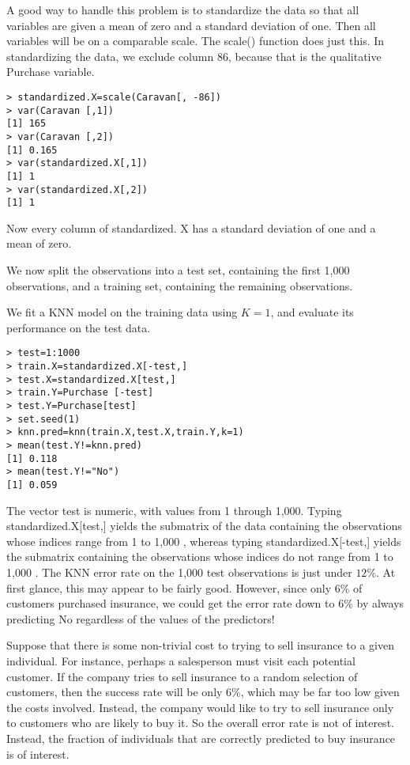 \documentclass[10pt]{article}
\begin{document}
A good way to handle this problem is to standardize the data so that all variables are given a mean of zero and a standard deviation of one. Then all variables will be on a comparable scale. The scale() function does just this. In standardizing the data, we exclude column 86, because that is the qualitative Purchase variable.

\begin{verbatim}
> standardized.X=scale(Caravan[, -86])
> var(Caravan [,1])
[1] 165
> var(Caravan [,2])
[1] 0.165
> var(standardized.X[,1])
[1] 1
> var(standardized.X[,2])
[1] 1
\end{verbatim}

Now every column of standardized. X has a standard deviation of one and a mean of zero.

We now split the observations into a test set, containing the first 1,000 observations, and a training set, containing the remaining observations.


We fit a KNN model on the training data using $K=1$, and evaluate its performance on the test data.

\begin{verbatim}
> test=1:1000
> train.X=standardized.X[-test,]
> test.X=standardized.X[test,]
> train.Y=Purchase [-test]
> test.Y=Purchase[test]
> set.seed(1)
> knn.pred=knn(train.X,test.X,train.Y,k=1)
> mean(test.Y!=knn.pred)
[1] 0.118
> mean(test.Y!="No")
[1] 0.059
\end{verbatim}

The vector test is numeric, with values from 1 through 1,000. Typing standardized.X[test,] yields the submatrix of the data containing the observations whose indices range from 1 to 1,000 , whereas typing standardized.X[-test,] yields the submatrix containing the observations whose indices do not range from 1 to 1,000 . The KNN error rate on the 1,000 test observations is just under $12 \%$. At first glance, this may appear to be fairly good. However, since only $6 \%$ of customers purchased insurance, we could get the error rate down to $6 \%$ by always predicting No regardless of the values of the predictors!

Suppose that there is some non-trivial cost to trying to sell insurance to a given individual. For instance, perhaps a salesperson must visit each potential customer. If the company tries to sell insurance to a random selection of customers, then the success rate will be only $6 \%$, which may be far too low given the costs involved. Instead, the company would like to try to sell insurance only to customers who are likely to buy it. So the overall error rate is not of interest. Instead, the fraction of individuals that are correctly predicted to buy insurance is of interest.
\end{document}
